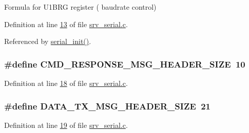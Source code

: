 Formula for U1\+B\+R\+G register ( baudrate control) 



Definition at line \hyperlink{a00030_source_l00013}{13} of file \hyperlink{a00030_source}{srv\+\_\+serial.\+c}.



Referenced by \hyperlink{a00030_source_l00159}{serial\+\_\+init()}.

\hypertarget{a00030_a70cf18090d97bf40a74a6ff7fd56d888}{
\subsubsection[{C\+M\+D\+\_\+\+R\+E\+S\+P\+O\+N\+S\+E\+\_\+\+M\+S\+G\+\_\+\+H\+E\+A\+D\+E\+R\+\_\+\+S\+I\+Z\+E}]{\setlength{\rightskip}{0pt plus 5cm}\#define C\+M\+D\+\_\+\+R\+E\+S\+P\+O\+N\+S\+E\+\_\+\+M\+S\+G\+\_\+\+H\+E\+A\+D\+E\+R\+\_\+\+S\+I\+Z\+E~10}}\label{a00030_a70cf18090d97bf40a74a6ff7fd56d888}


Definition at line \hyperlink{a00030_source_l00018}{18} of file \hyperlink{a00030_source}{srv\+\_\+serial.\+c}.

\hypertarget{a00030_a7704c8abe93ef4188dd1562167bdbe63}{
\subsubsection[{D\+A\+T\+A\+\_\+\+T\+X\+\_\+\+M\+S\+G\+\_\+\+H\+E\+A\+D\+E\+R\+\_\+\+S\+I\+Z\+E}]{\setlength{\rightskip}{0pt plus 5cm}\#define D\+A\+T\+A\+\_\+\+T\+X\+\_\+\+M\+S\+G\+\_\+\+H\+E\+A\+D\+E\+R\+\_\+\+S\+I\+Z\+E~21}}\label{a00030_a7704c8abe93ef4188dd1562167bdbe63}


Definition at line \hyperlink{a00030_source_l00019}{19} of file \hyperlink{a00030_source}{srv\+\_\+serial.\+c}.

